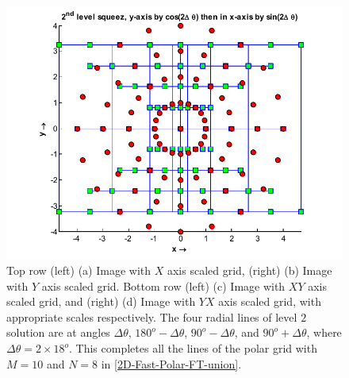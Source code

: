 \documentclass{UCF_ETD}
\begin{document}
\begin{figure}[H]
\begin{center}
 \includegraphics[scale=0.7]{PolarSphericalDFT/SecondLevelYXGrid}
 \caption{ Top row (left)  (a) Image with $X$ axis scaled grid, (right) (b) Image with $Y$ axis scaled grid. Bottom row (left) (c) Image with $XY$ axis scaled grid, and (right) (d) Image with $YX$ axis scaled grid, with appropriate scales respectively. The four radial lines of level $2$ solution are at angles $\Delta \theta$, $180^o - \Delta \theta$,  $90^o - \Delta \theta$, and  $90^o + \Delta \theta$, where $\Delta \theta = 2 \times 18^o$. This completes all the lines of the polar grid with $M = 10$ and $N = 8$ in \eqref{2D-Fast-Polar-FT-union}.}
 \label{Square_PolarTransformation2ndScale.fig}
 \end{center}
 \end{figure}
 
 
\end{document}
